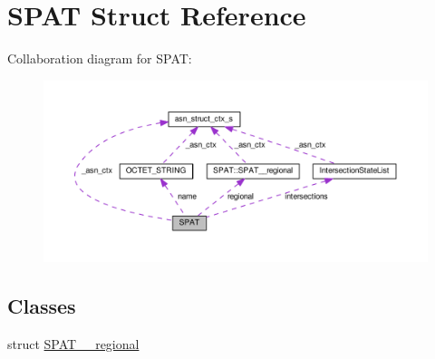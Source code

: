 \hypertarget{structSPAT}{}\section{S\+P\+AT Struct Reference}
\label{structSPAT}


Collaboration diagram for S\+P\+AT\+:\nopagebreak
\begin{figure}[H]
\begin{center}
\leavevmode
\includegraphics[width=350pt]{structSPAT__coll__graph}
\end{center}
\end{figure}
\subsection*{Classes}
\begin{DoxyCompactItemize}
\item 
struct \hyperlink{structSPAT_1_1SPAT____regional}{S\+P\+A\+T\+\_\+\+\_\+regional}
\end{DoxyCompactItemize}
